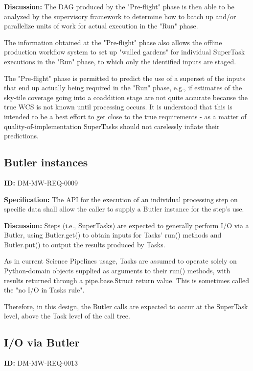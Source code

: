 \documentclass[SE,toc,lsstdraft]{lsstdoc}
\begin{document}
\textbf{Discussion:}
The DAG produced by the "Pre-flight" phase is then able to be analyzed by the supervisory framework to determine how to batch up and/or parallelize units of work for actual execution in the "Run" phase.

The information obtained at the "Pre-flight" phase also allows the offline production workflow system to set up "walled gardens" for individual SuperTask executions in the "Run" phase, to which only the identified inputs are staged.

The "Pre-flight" phase is permitted to predict the use of a superset of the inputs that end up actually being required in the "Run" phase, e.g., if estimates of the sky-tile coverage going into a coaddition stage are not quite accurate because the true WCS is not known until processing occurs. It is understood that this is intended to be a best effort to get close to the true requirements - as a matter of quality-of-implementation SuperTasks should not carelessly inflate their predictions.

\subsection{Butler instances}

\label{DM-MW-REQ-0009}
\textbf{ID:} DM-MW-REQ-0009

\textbf{Specification:}
The API for the execution of an individual processing step on specific data shall allow the caller to supply a Butler instance for the step's use.

\textbf{Discussion:}
Steps (i.e., SuperTasks) are expected to generally perform I/O via a Butler, using Butler.get() to obtain inputs for Tasks' run() methods and Butler.put() to output the results produced by Tasks.

As in current Science Pipelines usage, Tasks are assumed to operate solely on Python-domain objects supplied as arguments to their run() methods, with results returned through a pipe.base.Struct return value. This is sometimes called the "no I/O in Tasks rule".

Therefore, in this design, the Butler calls are expected to occur at the SuperTask level, above the Task level of the call tree.

\subsection{I/O via Butler}

\label{DM-MW-REQ-0013}
\textbf{ID:} DM-MW-REQ-0013
\end{document}
